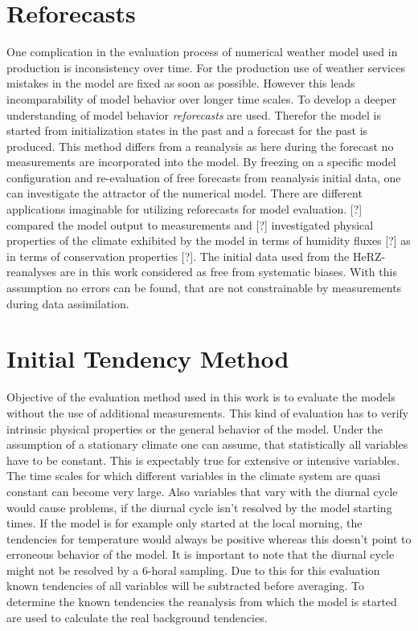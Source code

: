 \section{Reforecasts}
\p
One complication in the evaluation process of numerical weather model used in production is inconsistency over time. For the production use of weather services mistakes in the model are fixed as soon as possible. However this leads incomparability of model behavior over longer time scales.
\p
To develop a deeper understanding of model behavior \emph{reforecasts} are used. Therefor the model is started from initialization states in the past and a forecast for the past is produced. This method differs from a reanalysis as here during the forecast no measurements are incorporated into the model.
\p
By freezing on a specific model configuration and re-evaluation of free forecasts from reanalysis initial data, one can investigate the attractor of the numerical model.
\p
There are different applications imaginable for utilizing reforecasts for model evaluation. [?] compared the model output to measurements and [?] investigated physical properties of the climate exhibited by the model in terms of humidity fluxes [?] as in terms of conservation properties [?].
\p
The initial data used from the HeRZ-reanalyses are in this work considered as free from systematic biases. With this assumption no errors can be found, that are not constrainable by measurements during data assimilation. 
\section{Initial Tendency Method}
\p
Objective of the evaluation method used in this work is to evaluate the models without the use of additional measurements. This kind of evaluation has to verify intrinsic physical properties or the general behavior of the model.
\p
Under the assumption of a stationary climate one can assume, that statistically all variables have to be constant. This is expectably true for extensive or intensive variables.
\p
The time scales for which different variables in the climate system are quasi constant can become very large. Also variables that vary with the diurnal cycle would cause problems, if the diurnal cycle isn't resolved by the model starting times. If the model is for example only started at the local morning, the tendencies for temperature would always be positive whereas this doesn't point to erroneous behavior of the model. It is important to note that the diurnal cycle might not be resolved by a 6-horal sampling.
\p
Due to this for this evaluation known tendencies of all variables will be subtracted before averaging. To determine the known tendencies the reanalysis from which the model is started are used to calculate the real background tendencies.
\p

